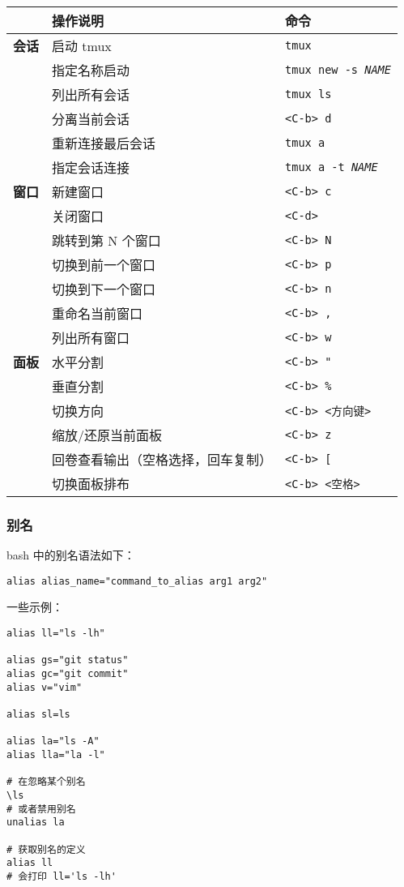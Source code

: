 \documentclass[a4paper,12pt]{ctexart}
\begin{document}
\begin{longtable}{|p{2.5cm}|p{5cm}|p{6cm}|}
\hline
& \textbf{操作说明} & \textbf{命令} \\
\hline
\endfirsthead
\hline
\textbf{会话} &
启动 tmux & \texttt{tmux} \\
\cline{2-3}
& 指定名称启动 & \texttt{tmux new -s \emph{NAME}} \\
\cline{2-3}
& 列出所有会话 & \texttt{tmux ls} \\
\cline{2-3}
& 分离当前会话 & \texttt{<C-b> d} \\
\cline{2-3}
& 重新连接最后会话 & \texttt{tmux a} \\
\cline{2-3}
& 指定会话连接 & \texttt{tmux a -t \emph{NAME}} \\
\hline

\textbf{窗口} &
新建窗口 & \texttt{<C-b> c} \\
\cline{2-3}
& 关闭窗口 & \texttt{<C-d>} \\
\cline{2-3}
& 跳转到第 N 个窗口 & \texttt{<C-b> N} \\
\cline{2-3}
& 切换到前一个窗口 & \texttt{<C-b> p} \\
\cline{2-3}
& 切换到下一个窗口 & \texttt{<C-b> n} \\
\cline{2-3}
& 重命名当前窗口 & \texttt{<C-b> ,} \\
\cline{2-3}
& 列出所有窗口 & \texttt{<C-b> w} \\
\hline

\textbf{面板} &
水平分割 & \texttt{<C-b> "} \\
\cline{2-3}
& 垂直分割 & \texttt{<C-b> \%} \\
\cline{2-3}
& 切换方向 & \texttt{<C-b> <方向键>} \\
\cline{2-3}
& 缩放/还原当前面板 & \texttt{<C-b> z} \\
\cline{2-3}
& 回卷查看输出（空格选择，回车复制） & \texttt{<C-b> [} \\
\cline{2-3}
& 切换面板排布 & \texttt{<C-b> <空格>} \\
\hline
\end{longtable}

\subsubsection{别名}

bash 中的别名语法如下：
\begin{lstlisting}
alias alias_name="command_to_alias arg1 arg2"
\end{lstlisting}
一些示例：
\begin{lstlisting}
alias ll="ls -lh"

alias gs="git status"
alias gc="git commit"
alias v="vim"

alias sl=ls

alias la="ls -A"
alias lla="la -l"

# 在忽略某个别名
\ls
# 或者禁用别名
unalias la

# 获取别名的定义
alias ll
# 会打印 ll='ls -lh'
\end{lstlisting}
\end{document}
